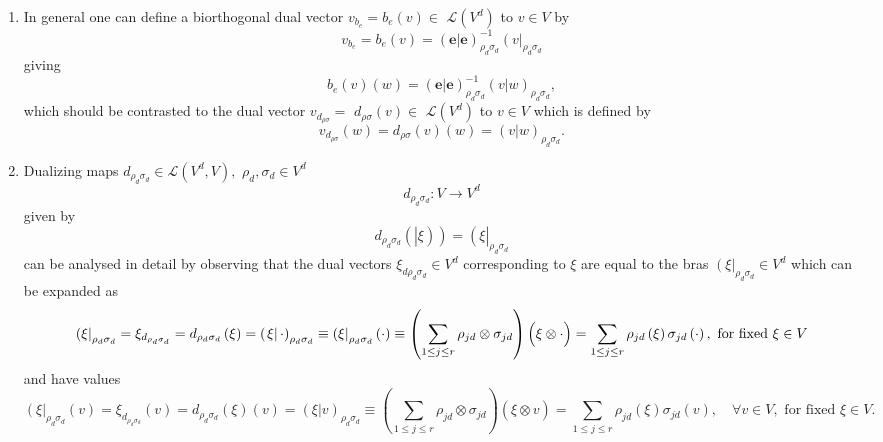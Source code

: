 \documentclass[aps,preprint]{revtex4}
\begin{document}
\begin{enumerate}
\item In general one can define a biorthogonal dual vector $%
v_{b_{e}}=b_{e}\left( v\right) \in $ $\mathcal{L}\left( V^{d}\right) $ to $%
v\in V$ by 
\begin{equation}
v_{b_{e}}=b_{e}\left( v\right) =\left( \left. \boldsymbol{e}\right\vert 
\boldsymbol{e}\right) _{\rho _{d}\sigma _{d}}^{-1}\left( v\right\vert _{\rho
_{d}\sigma _{d}}
\end{equation}%
giving 
\begin{equation}
b_{e}\left( v\right) \left( w\right) =\left( \left. \boldsymbol{e}%
\right\vert \boldsymbol{e}\right) _{\rho _{d}\sigma _{d}}^{-1}\left( \left.
v\right\vert w\right) _{\rho _{d}\sigma _{d}},
\end{equation}%
which should be contrasted to the dual vector $v_{d_{\rho \sigma }}=$ $%
d_{\rho \sigma }\left( v\right) \in $ $\mathcal{L}\left( V^{d}\right) $ to $%
v\in V$ which is defined by%
\begin{equation}
v_{d_{\rho \sigma }}\left( w\right) =d_{\rho \sigma }\left( v\right) \left(
w\right) =\left( \left. v\right\vert w\right) _{\rho _{d}\sigma _{d}}.
\end{equation}

\item Dualizing maps $d_{\rho _{d}\sigma _{d}}\in \mathcal{L}\left(
V^{d},V\right) ,$ $\rho _{d},\sigma _{d}\in V^{d}$ 
\begin{equation}
d_{\rho _{d}\sigma _{d}}:V\rightarrow V^{d}
\end{equation}%
given by%
\begin{equation}
d_{\rho _{d}\sigma _{d}}\left( \left\vert \overset{}{\xi }\right) \right)
=\left( \overset{}{\xi }\right\vert _{\rho _{d}\sigma _{d}}
\end{equation}%
can be analysed in detail by observing that the dual vectors $\xi _{d\rho
_{d}\sigma _{d}}\in V^{d}$ corresponding to $\xi $ are equal to the bras $%
\left( \xi \right\vert _{\rho _{d}\sigma _{d}}\in V^{d}$ which can be
expanded as 
\begin{equation}
\left( \xi \right\vert _{\rho _{d}\sigma _{d}}=\xi _{d_{\rho _{d}\sigma
_{d}}}=d_{\rho _{d}\sigma _{d}}\left( \xi \right) =\left( \left. \xi
\right\vert \cdot \right) _{\rho _{d}\sigma _{d}}\equiv \left( \xi
\right\vert _{\rho _{d}\sigma _{d}}\left( \cdot \right) \equiv \left(
\sum_{1\leq j\leq r}\rho _{jd}\otimes \sigma _{jd}\right) \left( \overset{}{%
\xi \otimes \cdot }\right) =\sum_{1\leq j\leq r}\rho _{jd}\left( \xi \right)
\sigma _{jd}\left( \cdot \right) ,\text{ for fixed }\xi \in V
\end{equation}%
and have values%
\begin{equation}
\left( \xi \right\vert _{\rho _{d}\sigma _{d}}\left( v\right) =\xi _{d_{\rho
_{d}\sigma _{d}}}\left( v\right) =d_{\rho _{d}\sigma _{d}}\left( \xi \right)
\left( v\right) =\left( \left. \xi \right\vert v\right) _{\rho _{d}\sigma
_{d}}\equiv \left( \sum_{1\leq j\leq r}\rho _{jd}\otimes \sigma _{jd}\right)
\left( \overset{}{\xi \otimes v}\right) =\sum_{1\leq j\leq r}\rho
_{jd}\left( \xi \right) \sigma _{jd}\left( v\right) ,\quad \forall v\in V,%
\text{ for fixed }\xi \in V.
\end{equation}


\end{enumerate}
\end{document}
